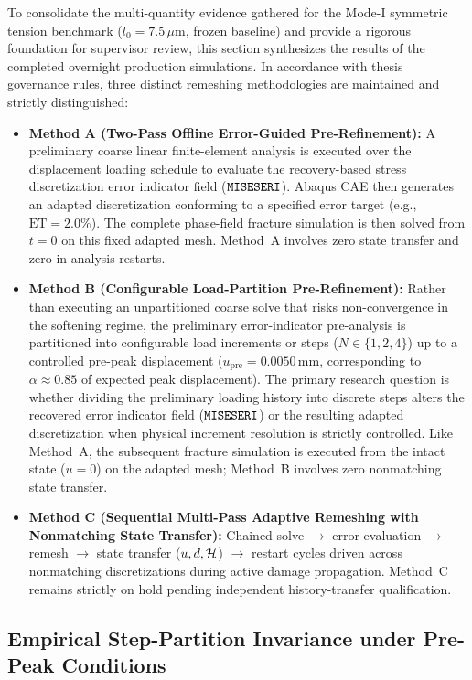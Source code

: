To consolidate the multi-quantity evidence gathered for the Mode-I symmetric tension benchmark ($l_0 = 7.5\,\mu\mathrm{m}$, frozen baseline) and provide a rigorous foundation for supervisor review, this section synthesizes the results of the completed overnight production simulations. In accordance with thesis governance rules, three distinct remeshing methodologies are maintained and strictly distinguished:
\begin{itemize}
  \item \textbf{Method A (Two-Pass Offline Error-Guided Pre-Refinement):} A preliminary coarse linear finite-element analysis is executed over the displacement loading schedule to evaluate the recovery-based stress discretization error indicator field ($\texttt{MISESERI}$). Abaqus CAE then generates an adapted discretization conforming to a specified error target (e.g., $\mathrm{ET} = 2.0\%$). The complete phase-field fracture simulation is then solved from $t = 0$ on this fixed adapted mesh. Method~A involves zero state transfer and zero in-analysis restarts.
  \item \textbf{Method B (Configurable Load-Partition Pre-Refinement):} Rather than executing an unpartitioned coarse solve that risks non-convergence in the softening regime, the preliminary error-indicator pre-analysis is partitioned into configurable load increments or steps ($N \in \{1, 2, 4\}$) up to a controlled pre-peak displacement ($u_{\mathrm{pre}} = 0.0050\,\mathrm{mm}$, corresponding to $\alpha \approx 0.85$ of expected peak displacement). The primary research question is whether dividing the preliminary loading history into discrete steps alters the recovered error indicator field ($\texttt{MISESERI}$) or the resulting adapted discretization when physical increment resolution is strictly controlled. Like Method~A, the subsequent fracture simulation is executed from the intact state ($u = 0$) on the adapted mesh; Method~B involves zero nonmatching state transfer.
  \item \textbf{Method C (Sequential Multi-Pass Adaptive Remeshing with Nonmatching State Transfer):} Chained solve $\to$ error evaluation $\to$ remesh $\to$ state transfer ($u, d, \mathcal{H}$) $\to$ restart cycles driven across nonmatching discretizations during active damage propagation. Method~C remains strictly on hold pending independent history-transfer qualification.
\end{itemize}

\subsection{Empirical Step-Partition Invariance under Pre-Peak Conditions}
\label{subsec:gate6b_partition_invariance}

